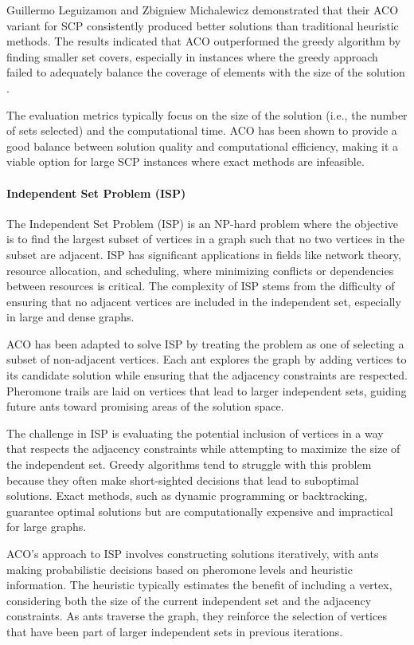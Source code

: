Guillermo Leguizamon and Zbigniew Michalewicz demonstrated that their ACO variant for SCP consistently produced better solutions than traditional heuristic methods\cite{Leguizamon1999}. The results indicated that ACO outperformed the greedy algorithm by finding smaller set covers, especially in instances where the greedy approach failed to adequately balance the coverage of elements with the size of the solution \cite{Leguizamon1999}.

The evaluation metrics typically focus on the size of the solution (i.e., the number of sets selected) and the computational time. ACO has been shown to provide a good balance between solution quality and computational efficiency, making it a viable option for large SCP instances where exact methods are infeasible.

\paragraph{Independent Set Problem (ISP)}
The Independent Set Problem (ISP) is an NP-hard problem where the objective is to find the largest subset of vertices in a graph such that no two vertices in the subset are adjacent. ISP has significant applications in fields like network theory, resource allocation, and scheduling, where minimizing conflicts or dependencies between resources is critical. The complexity of ISP stems from the difficulty of ensuring that no adjacent vertices are included in the independent set, especially in large and dense graphs.

ACO has been adapted to solve ISP by treating the problem as one of selecting a subset of non-adjacent vertices. Each ant explores the graph by adding vertices to its candidate solution while ensuring that the adjacency constraints are respected. Pheromone trails are laid on vertices that lead to larger independent sets, guiding future ants toward promising areas of the solution space.

The challenge in ISP is evaluating the potential inclusion of vertices in a way that respects the adjacency constraints while attempting to maximize the size of the independent set. Greedy algorithms tend to struggle with this problem because they often make short-sighted decisions that lead to suboptimal solutions. Exact methods, such as dynamic programming or backtracking, guarantee optimal solutions but are computationally expensive and impractical for large graphs.

ACO’s approach to ISP involves constructing solutions iteratively, with ants making probabilistic decisions based on pheromone levels and heuristic information. The heuristic typically estimates the benefit of including a vertex, considering both the size of the current independent set and the adjacency constraints. As ants traverse the graph, they reinforce the selection of vertices that have been part of larger independent sets in previous iterations.

